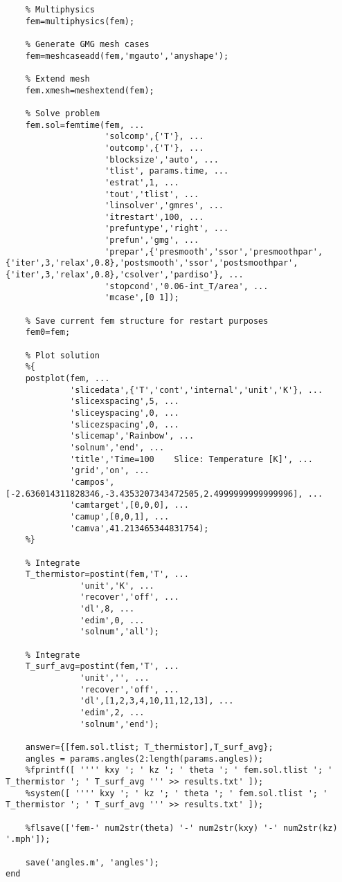 \begin{verbatim}
    % Multiphysics
    fem=multiphysics(fem);

    % Generate GMG mesh cases
    fem=meshcaseadd(fem,'mgauto','anyshape');

    % Extend mesh
    fem.xmesh=meshextend(fem);

    % Solve problem
    fem.sol=femtime(fem, ...
                    'solcomp',{'T'}, ...
                    'outcomp',{'T'}, ...
                    'blocksize','auto', ...
                    'tlist', params.time, ...
                    'estrat',1, ...
                    'tout','tlist', ...
                    'linsolver','gmres', ...
                    'itrestart',100, ...
                    'prefuntype','right', ...
                    'prefun','gmg', ...
                    'prepar',{'presmooth','ssor','presmoothpar',{'iter',3,'relax',0.8},'postsmooth','ssor','postsmoothpar',{'iter',3,'relax',0.8},'csolver','pardiso'}, ...
                    'stopcond','0.06-int_T/area', ...
                    'mcase',[0 1]);

    % Save current fem structure for restart purposes
    fem0=fem;

    % Plot solution
    %{
    postplot(fem, ...
             'slicedata',{'T','cont','internal','unit','K'}, ...
             'slicexspacing',5, ...
             'sliceyspacing',0, ...
             'slicezspacing',0, ...
             'slicemap','Rainbow', ...
             'solnum','end', ...
             'title','Time=100    Slice: Temperature [K]', ...
             'grid','on', ...
             'campos',[-2.636014311828346,-3.4353207343472505,2.4999999999999996], ...
             'camtarget',[0,0,0], ...
             'camup',[0,0,1], ...
             'camva',41.213465344831754);
    %}

    % Integrate
    T_thermistor=postint(fem,'T', ...
               'unit','K', ...
               'recover','off', ...
               'dl',8, ...
               'edim',0, ...
               'solnum','all');

    % Integrate
    T_surf_avg=postint(fem,'T', ...
               'unit','', ...
               'recover','off', ...
               'dl',[1,2,3,4,10,11,12,13], ...
               'edim',2, ...
               'solnum','end');

    answer={[fem.sol.tlist; T_thermistor],T_surf_avg};
    angles = params.angles(2:length(params.angles));
    %fprintf([ '''' kxy '; ' kz '; ' theta '; ' fem.sol.tlist '; ' T_thermistor '; ' T_surf_avg ''' >> results.txt' ]);
    %system([ '''' kxy '; ' kz '; ' theta '; ' fem.sol.tlist '; ' T_thermistor '; ' T_surf_avg ''' >> results.txt' ]);

    %flsave(['fem-' num2str(theta) '-' num2str(kxy) '-' num2str(kz) '.mph']);

    save('angles.m', 'angles');
end
\end{verbatim}
\normalsize

